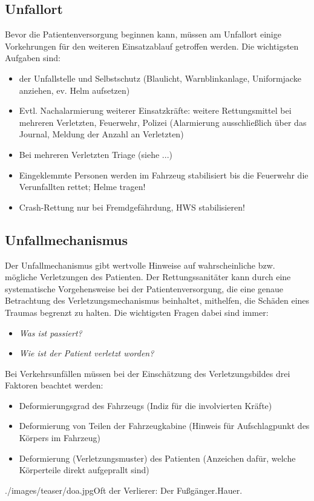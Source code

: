 \subsection{Unfallort}
Bevor die Patientenversorgung beginnen kann, müssen am Unfallort einige
Vorkehrungen für den weiteren Einsatzablauf getroffen werden. Die wichtigsten
Aufgaben sind:
\begin{itemize}
  \item {} der Unfallstelle und Selbstschutz
  (Blaulicht, Warnblinkanlage, Uniformjacke anziehen, ev. Helm aufsetzen)
  \item Evtl. Nachalarmierung weiterer Einsatzkräfte:
  weitere Rettungsmittel bei mehreren Verletzten, Feuerwehr, Polizei
  (Alarmierung ausschließlich über das Journal, Meldung der Anzahl an Verletzten)
  \item Bei mehreren Verletzten Triage (siehe ...)
  \item Eingeklemmte Personen werden im Fahrzeug stabilisiert bis die Feuerwehr
  die Verunfallten rettet; Helme tragen!
  \item Crash-Rettung nur bei Fremdgefährdung, HWS stabilisieren!
\end{itemize}

\subsection{Unfallmechanismus}
Der Unfallmechanismus gibt wertvolle Hinweise auf wahrscheinliche bzw. mögliche
Verletzungen des Patienten. Der Rettungssanitäter kann durch eine systematische
Vorgehensweise bei der Patientenversorgung, die eine genaue Betrachtung des
Verletzungsmechanismus beinhaltet, mithelfen, die Schäden eines Traumas begrenzt
zu halten. Die wichtigsten Fragen dabei sind immer:
\begin{itemize}
    \item \emph{Was ist passiert?}
    \item \emph{Wie ist der Patient verletzt worden?}
\end{itemize}

{ Bei Verkehrsunfällen müssen bei der Einschätzung des Verletzungsbildes drei
Faktoren beachtet werden:
\begin{itemize}
  \item Deformierungsgrad des Fahrzeugs (Indiz für die involvierten Kräfte)
  \item Deformierung von Teilen der Fahrzeugkabine (Hinweis für Aufschlagpunkt
  des Körpers im Fahrzeug)
  \item Deformierung (Verletzungsmuster) des Patienten (Anzeichen dafür,
  welche Körperteile direkt aufgeprallt sind)
\end{itemize}
}{
\SymbolText
}{./images/teaser/doa.jpg}{Oft der Verlierer: Der
Fußgänger.}{Hauer.}



